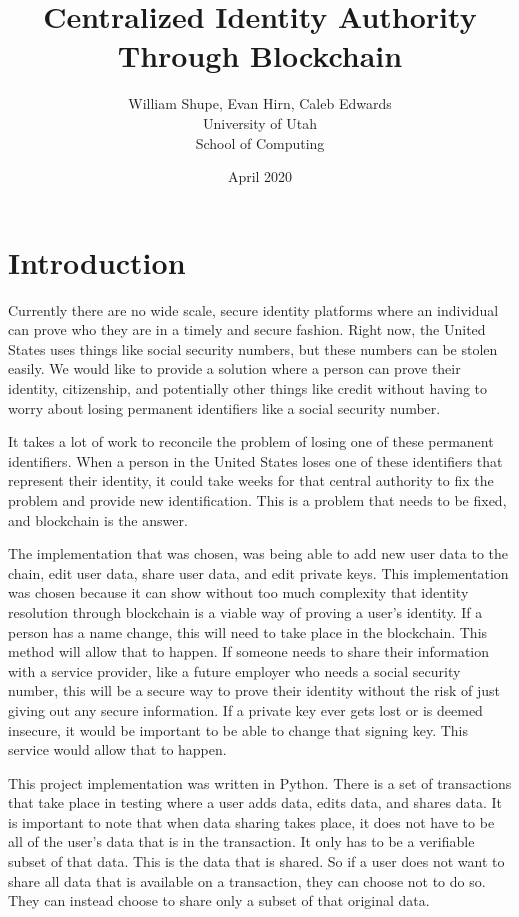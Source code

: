 \documentclass[letterpaper, 10 pt, conference]{ieeeconf}  %
\title{Centralized Identity Authority Through Blockchain}
\author{William Shupe, Evan Hirn, Caleb Edwards \\ University of Utah \\ School of Computing}
\date{April 2020}
\begin{document}
\maketitle

\section{Introduction}

Currently there are no wide scale, secure identity platforms where an individual can prove who they are in a timely and secure fashion. Right now, the United States uses things like social security numbers, but these numbers can be stolen easily. We would like to provide a solution where a person can prove their identity, citizenship, and potentially
other things like credit without having to worry about losing permanent identifiers like a social security number.

It takes a lot of work to reconcile the problem of losing one of these permanent identifiers. When a person in the United States loses one of these identifiers that represent their identity, it could take weeks for that central authority to fix the problem and provide new identification. This is a problem that needs to be fixed, and blockchain is the answer.

The implementation that was chosen, was being able to add new user data to the chain, edit user data, share user data, and edit private keys. This implementation was chosen because it can show without too much complexity that identity resolution through blockchain is a viable way of proving a user's identity. If a person has a name change, this will need to take place in the blockchain. This method will allow that to happen. If someone needs to share their information with a service provider, like a future employer who needs a social security number, this will be a secure way to prove their identity without the risk of just giving out any secure information. If a private key ever gets lost or is deemed insecure, it would be important to be able to change that signing key. This service would allow that to happen. 

This project implementation was written in Python. There is a set of transactions that take place in testing where a user adds data, edits data, and shares data. It is important to note that when data sharing takes place, it does not have to be all of the user's data that is in the transaction. It only has to be a verifiable subset of that data. This is the data that is shared. So if a user does not want to share all data that is available on a transaction, they can choose not to do so. They can instead choose to share only a subset of that original data. 
\end{document}
